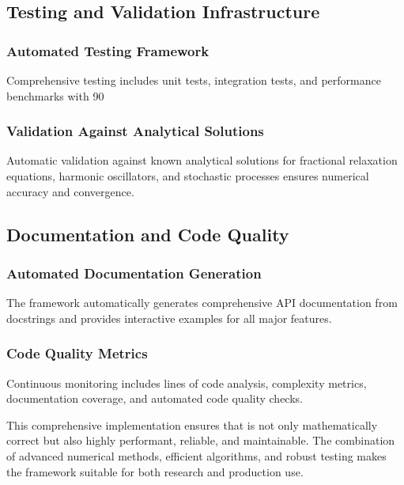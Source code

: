 \subsection{Testing and Validation Infrastructure}

\subsubsection{Automated Testing Framework}

Comprehensive testing includes unit tests, integration tests, and performance benchmarks with 90%

\subsubsection{Validation Against Analytical Solutions}

Automatic validation against known analytical solutions for fractional relaxation equations, harmonic oscillators, and stochastic processes ensures numerical accuracy and convergence.

\subsection{Documentation and Code Quality}

\subsubsection{Automated Documentation Generation}

The framework automatically generates comprehensive API documentation from docstrings and provides interactive examples for all major features.

\subsubsection{Code Quality Metrics}

Continuous monitoring includes lines of code analysis, complexity metrics, documentation coverage, and automated code quality checks.

This comprehensive implementation ensures that \hpfracc is not only mathematically correct but also highly performant, reliable, and maintainable. The combination of advanced numerical methods, efficient algorithms, and robust testing makes the framework suitable for both research and production use.
